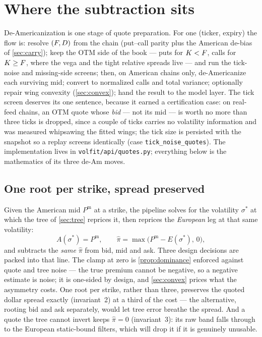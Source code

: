 \documentclass[11pt]{article}
\begin{document}
\section{Where the subtraction sits}
\label{sec:pipeline}

De-Americanization is one stage of quote preparation.  For one (ticker,
expiry) the flow is: resolve $(F,D)$ from the chain (put--call parity
plus the American de-bias of \cref{sec:carry}); keep the OTM side of the
book --- puts for $K<F$, calls for $K\ge F$, where the vega and the
tight relative spreads live --- and run the tick-noise and missing-side
screens; then, on American chains only, de-Americanize each surviving mid;
convert to normalized calls and total variance; optionally repair wing
convexity (\cref{sec:convex}); hand the result to the model layer.  The
tick screen deserves its one sentence, because it earned a certification
case: on real-feed chains, an OTM quote whose \emph{bid} --- not its mid ---
is worth no more than three ticks is dropped, since a couple of ticks
carries no volatility information and was measured whipsawing the fitted
wings; the tick size is persisted with the snapshot so a replay screens
identically (case \texttt{tick\_noise\_quotes}).  The
implementation lives in \texttt{volfit/api/quotes.py}; everything below is
the mathematics of its three de-Am moves.

\subsection{One root per strike, spread preserved}

Given the American mid $P^{\mathrm m}$ at a strike, the pipeline solves for
the volatility $\sigma^*$ at which the tree of \cref{sec:tree} reprices it,
then reprices the \emph{European} leg at that same volatility:
\begin{equation}
A(\sigma^*)=P^{\mathrm m},\qquad
\hat\pi=\max\!\big(P^{\mathrm m}-E(\sigma^*),\,0\big),
\label{eq:eephat}
\end{equation}
and subtracts the \emph{same} $\hat\pi$ from bid, mid and ask.  Three
design decisions are packed into that line.  The clamp at zero is
\cref{prop:dominance} enforced against quote and tree noise --- the true
premium cannot be negative, so a negative estimate is noise; it is
one-sided by design, and \cref{sec:convex} prices what the asymmetry
costs.  One root per strike, rather than three, preserves the quoted
dollar spread exactly (invariant~2) at a third of the cost --- the
alternative, rooting bid and ask separately, would let tree error breathe
the spread.  And a quote the tree cannot invert keeps $\hat\pi=0$
(invariant~3): its raw band falls through to the European static-bound
filters, which will drop it if it is genuinely unusable.
\end{document}
